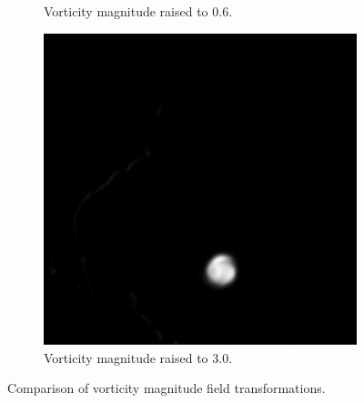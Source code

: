 \documentclass{article}
\begin{document}
\begin{figure}[h!]
\begin{subfigure}{0.32\textwidth}
        \caption{Vorticity magnitude raised to 0.6.}
    \end{subfigure}
    \hfill
    \begin{subfigure}{0.32\textwidth}
        \centering
        \includegraphics[width=\textwidth]{pow_3_0.png}
        \caption{Vorticity magnitude raised to 3.0.}
    \end{subfigure}
    \caption{Comparison of vorticity magnitude field transformations.}
\end{figure}
\end{document}
